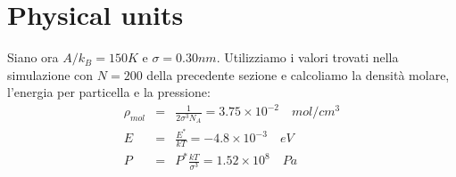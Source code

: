 \documentclass[a4paper,11pt]{article}
\begin{document}
\section*{Physical units}
\noindent Siano ora $A/k_B=150 K$ e $\sigma=0.30 nm$. Utilizziamo i valori trovati nella simulazione con $N=200$ della precedente sezione e calcoliamo la densità molare, l'energia per particella e la pressione:
\begin{eqnarray*}
	\rho_{mol} &=& \frac{1}{2 \sigma^3 N_A} =3.75 \times 10^{-2}\quad mol/cm^3 \\	
	E &=& \frac{E^*}{kT} = -4.8 \times 10^{-3}\quad eV\\
	P &=& P^* \frac{kT}{\sigma^3} = 1.52 \times 10^{8}\quad Pa\\
\end{eqnarray*}
\medskip
\end{document}
